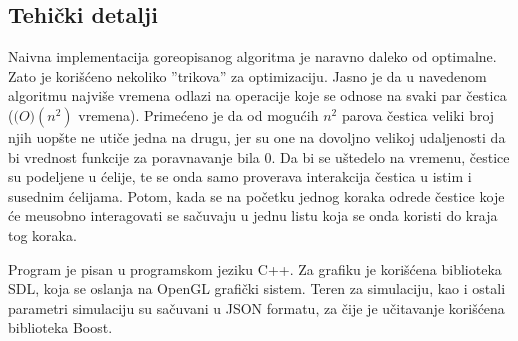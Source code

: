 \documentclass[12pt]{article}
\begin{document}
    \subsection{Tehi\v cki detalji}
        Naivna implementacija goreopisanog algoritma je naravno daleko od optimalne. Zato je kori\v s\'ceno nekoliko ''trikova'' za optimizaciju. Jasno je da u navedenom algoritmu najvi\v se vremena odlazi na operacije koje se odnose na svaki par \v cestica ($\mathcal(O)(n^2)$ vremena). Prime\'ceno je da od mogu\'cih $n^2$ parova \v cestica veliki broj njih uop\v ste ne uti\v ce jedna na drugu, jer su one na dovoljno velikoj udaljenosti da bi vrednost funkcije za poravnavanje bila $0$. Da bi se u\v stedelo na vremenu, \v cestice su podeljene u \'celije, te se onda samo proverava interakcija \v cestica u istim i susednim \' celijama. Potom, kada se na po\v cetku jednog koraka odrede \v cestice koje \'ce me\dj usobno interagovati se sa\v cuvaju u jednu listu koja se onda koristi do kraja tog koraka.
        
        Program je pisan u programskom jeziku C++. Za grafiku je kori\v s\'cena biblioteka SDL, koja se oslanja na OpenGL grafi\v cki sistem.
        Teren za simulaciju, kao i ostali parametri simulaciju su sa\v cuvani u JSON formatu, za \v cije je u\v citavanje kori\v s\'cena biblioteka Boost.
\end{document}
